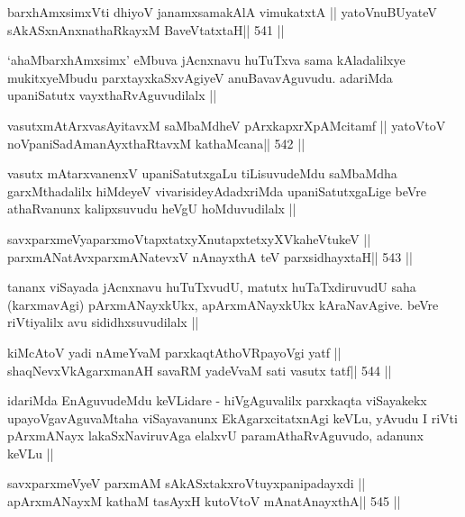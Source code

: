 
\begin{shl}
barxhAmxsimxVti dhiyoV janamxsamakAlA vimukatxtA ||
yatoV\s nuBUyateV sAkASxnAnxnathaRkayxM BaveVtatxtaH\hfill || 541 ||
\end{shl}

\begin{artha}
`ahaMbarxhAmxsimx' eMbuva jAcnxnavu huTuTxva sama kAladalilxye
  mukitxyeMbudu parxtayxkaSxvAgiyeV anuBavavAguvudu. adariMda
  upaniSatutx vayxthaRvAguvudilalx ||
\end{artha}

\begin{shl}
vasutxmAtArxvasAyitavxM saMbaMdheV pArxkapxrXpAMcitamf ||
yatoV\s toV noVpaniSadAmanAyxthaRtavxM kathaMcana\hfill || 542 ||
\end{shl}

\begin{artha}
vasutx mAtarxvanenxV upaniSatutxgaLu tiLisuvudeMdu saMbaMdha
garxMthadalilx hiMdeyeV vivarisideyAdadxriMda upaniSatutxgaLige beVre
athaRvanunx kalipxsuvudu heVgU hoMduvudilalx ||
\end{artha}



\begin{shl}
savxparxmeVyaparxmoVtapxtatxyXnutapxtetxyXVkaheVtukeV ||
parxmANatAvxparxmANatevxV nAnayxthA teV parxsidhayxtaH\hfill || 543 ||
\end{shl}

\begin{artha}
tananx viSayada jAcnxnavu huTuTxvudU, matutx huTaTxdiruvudU saha
(karxmavAgi) pArxmANayxkUkx, apArxmANayxkUkx kAraNavAgive. beVre
riVtiyalilx avu sididhxsuvudilalx ||
\end{artha}

\begin{shl}
kiMcAtoV yadi nAmeYvaM parxkaqtAthoVRpayoVgi yatf ||
shaqNevxVkAgarxmanAH savaRM yadeVvaM sati vasutx tatf\hfill || 544 ||
\end{shl}

\begin{artha}
idariMda EnAguvudeMdu keVLidare - hiVgAguvalilx parxkaqta viSayakekx
upayoVgavAguvaMtaha viSayavanunx EkAgarxcitatxnAgi keVLu, yAvudu I
riVti pArxmANayx lakaSxNaviruvAga elalxvU paramAthaRvAguvudo, adanunx
keVLu ||
\end{artha}

\begin{shl}
savxparxmeVyeV parxmAM sAkASxtakxroVtuyxpanipadayxdi ||
apArxmANayxM kathaM tasAyxH kutoV\s toV mAnatA\s nayxthA\hfill || 545 ||
\end{shl}

